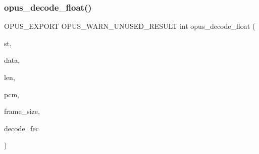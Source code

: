 \subsubsection{\texorpdfstring{opus\+\_\+decode\+\_\+float()}{opus\_decode\_float()}}
{\footnotesize\ttfamily O\+P\+U\+S\+\_\+\+E\+X\+P\+O\+RT O\+P\+U\+S\+\_\+\+W\+A\+R\+N\+\_\+\+U\+N\+U\+S\+E\+D\+\_\+\+R\+E\+S\+U\+LT int opus\+\_\+decode\+\_\+float (\begin{DoxyParamCaption}\item[{\hyperlink{group__opus__decoder_ga401d8579958d36094715a6b90cd159a6}{Opus\+Decoder} $\ast$}]{st,  }\item[{\hyperlink{zconf_8h_a2c212835823e3c54a8ab6d95c652660e}{const} unsigned char $\ast$}]{data,  }\item[{\hyperlink{opus__types_8h_aa4d309d6f80b99dbabebc8f98879ab9a}{opus\+\_\+int32}}]{len,  }\item[{float $\ast$}]{pcm,  }\item[{int}]{frame\+\_\+size,  }\item[{int}]{decode\+\_\+fec }\end{DoxyParamCaption})}

